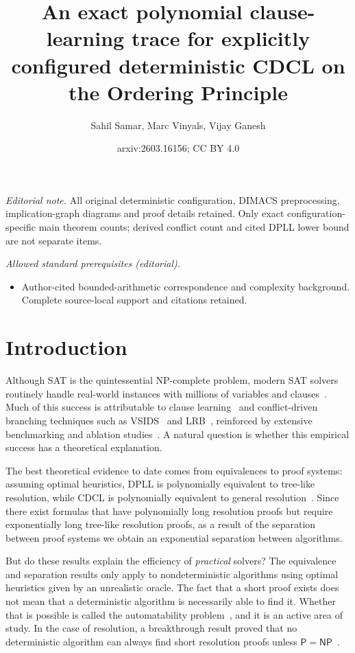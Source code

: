 \documentclass[10pt,a4paper]{article}
\title{An exact polynomial clause-learning trace for explicitly configured deterministic CDCL on the Ordering Principle}
\author{Sahil Samar, Marc Vinyals, Vijay Ganesh}
\date{arxiv:2603.16156; CC BY 4.0}
\begin{document}
\maketitle
\noindent\textit{Editorial note.} All original deterministic configuration, DIMACS preprocessing, implication-graph diagrams and proof details retained. Only exact configuration-specific main theorem counts; derived conflict count and cited DPLL lower bound are not separate items.\par\medskip
\noindent\textit{Allowed standard prerequisites (editorial).}\begin{itemize}
\item Author-cited bounded-arithmetic correspondence and complexity background. Complete source-local support and citations retained.
\end{itemize}\medskip
\section{Introduction}
Although SAT is the quintessential NP-complete problem, modern SAT solvers routinely handle real-world instances with millions of variables and clauses~\cite{unreasonable}. Much of this success is attributable to clause learning~\cite{grasp} and conflict-driven branching techniques such as VSIDS~\cite{chaff} and LRB~\cite{maplesat}, reinforced by extensive benchmarking and ablation studies~\cite{katebi2011empirical,elffers2018seeking}. A natural question is whether this empirical success has a theoretical explanation.

The best theoretical evidence to date comes from equivalences to proof systems: assuming optimal heuristics, DPLL is polynomially equivalent to tree-like resolution, while CDCL is polynomially equivalent to general resolution~\cite{simres,manyrestarts}. Since there exist formulas that have polynomially long resolution proofs but require exponentially long tree-like resolution proofs, as a result of the separation between proof systems we obtain an exponential separation between algorithms.

But do these results explain the efficiency of \textit{practical} solvers? The equivalence and separation results only apply to nondeterministic algorithms using optimal heuristics given by an unrealistic oracle. The fact that a short proof exists does not mean that a deterministic algorithm is necessarily able to find it. Whether that is possible is called the automatability problem~\cite{DBLP:journals/siamcomp/BonetPR00}, and it is an active area of study. In the case of resolution, a breakthrough result proved that no deterministic algorithm can always find short resolution proofs unless $\mathsf{P}=\mathsf{NP}$~\cite{DBLP:journals/jacm/AtseriasM20}.
\end{document}
